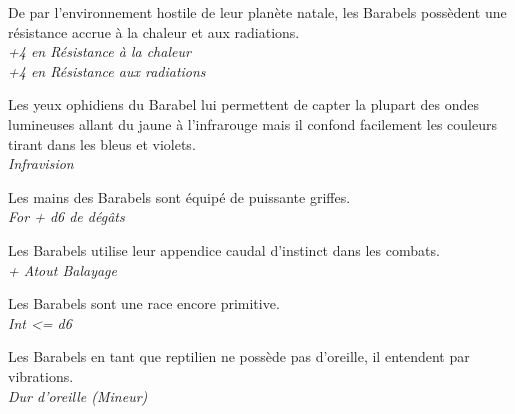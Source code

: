 \begin{description}[align=left]
\item [Enfance difficile] 	%
		De par l'environnement hostile de leur planète natale, les Barabels possèdent une résistance accrue à la chaleur et aux radiations.\\
		\emph{+4 en Résistance à la chaleur}\\
		\emph{+4 en Résistance aux radiations}
\item [\OE{il} Ophidien] 	%
		Les yeux ophidiens du Barabel lui permettent de capter la plupart des ondes lumineuses allant du jaune à l'infrarouge mais il confond facilement les couleurs tirant dans les bleus et violets.\\
		\emph{Infravision}
\item [Arme naturelle]		%
		Les mains des Barabels sont équipé de puissante griffes.\\
		\emph{For + d6 de dégâts}
\item [Balayage]			%
		Les Barabels utilise leur appendice caudal d'instinct dans les combats.\\
		\emph{+ Atout Balayage}
\item [Primitif]			%
		Les Barabels sont une race encore primitive.\\
		\emph{Int <= d6}
\item [Dur d'oreille]		%
		Les Barabels en tant que reptilien ne possède pas d'oreille, il entendent par vibrations.\\
		\emph{Dur d'oreille (Mineur)}
\end{description}
